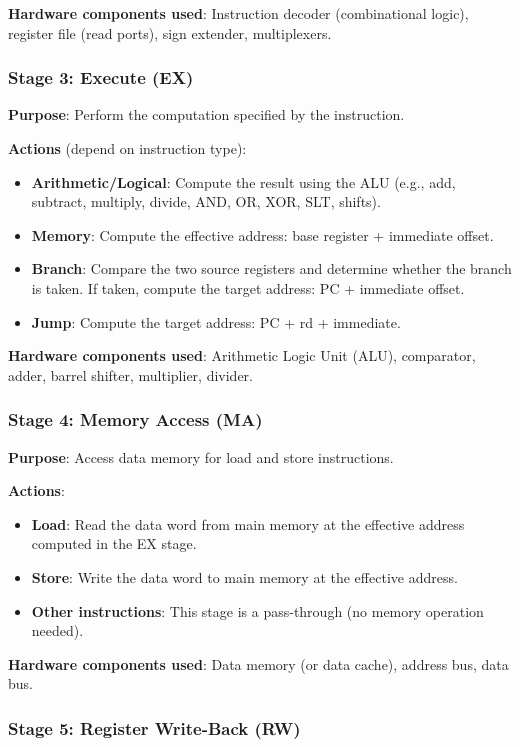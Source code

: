 \documentclass[12pt,a4paper]{article}
\begin{document}
\textbf{Hardware components used}: Instruction decoder (combinational logic), register file (read ports), sign extender, multiplexers.

\subsubsection{Stage 3: Execute (EX)}

\textbf{Purpose}: Perform the computation specified by the instruction.

\textbf{Actions} (depend on instruction type):
\begin{itemize}
    \item \textbf{Arithmetic/Logical}: Compute the result using the ALU (e.g., add, subtract, multiply, divide, AND, OR, XOR, SLT, shifts).
    \item \textbf{Memory}: Compute the effective address: base register + immediate offset.
    \item \textbf{Branch}: Compare the two source registers and determine whether the branch is taken. If taken, compute the target address: PC + immediate offset.
    \item \textbf{Jump}: Compute the target address: PC + rd + immediate.
\end{itemize}

\textbf{Hardware components used}: Arithmetic Logic Unit (ALU), comparator, adder, barrel shifter, multiplier, divider.

\subsubsection{Stage 4: Memory Access (MA)}

\textbf{Purpose}: Access data memory for load and store instructions.

\textbf{Actions}:
\begin{itemize}
    \item \textbf{Load}: Read the data word from main memory at the effective address computed in the EX stage.
    \item \textbf{Store}: Write the data word to main memory at the effective address.
    \item \textbf{Other instructions}: This stage is a pass-through (no memory operation needed).
\end{itemize}

\textbf{Hardware components used}: Data memory (or data cache), address bus, data bus.

\subsubsection{Stage 5: Register Write-Back (RW)}
\end{document}
